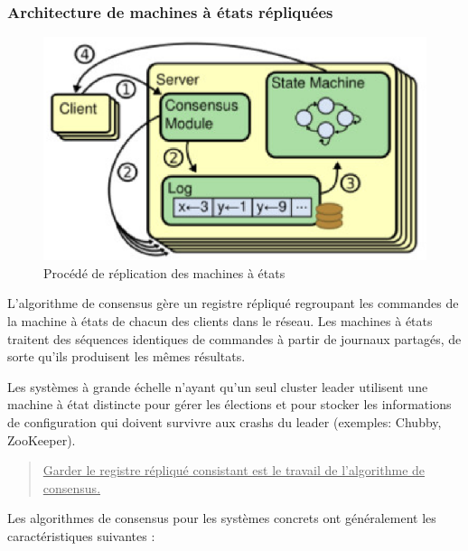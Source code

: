 \subsubsection{Architecture de machines à états répliquées}

\begin{figure}[H]
    \centerline{\includegraphics[width=.37\textwidth]{img/replicated_state_machine}}
    \caption{Procédé de réplication des machines à états}
    \label{replicated_state_machine}
\end{figure}

L'algorithme de consensus gère un registre répliqué regroupant les commandes de
la machine à états de chacun des clients dans le réseau. Les machines à états
traitent des séquences identiques de commandes à partir de journaux partagés, de
sorte qu'ils produisent les mêmes résultats.

Les systèmes à grande échelle n'ayant qu'un seul cluster leader utilisent une
machine à état distincte pour gérer les élections et pour stocker les
informations de configuration qui doivent survivre aux crashs du leader
(exemples: Chubby, ZooKeeper).

\begin{verse}
    \underline{
        Garder le registre répliqué consistant est le travail de l'algorithme de
        consensus.
    }
\end{verse}

Les algorithmes de consensus pour les systèmes concrets ont généralement les
caractéristiques suivantes :

